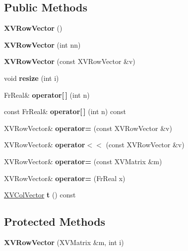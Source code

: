 \subsection*{Public Methods}
\begin{CompactItemize}
\item 
{\bf XVRow\-Vector} ()
\item 
{\bf XVRow\-Vector} (int nn)
\item 
{\bf XVRow\-Vector} (const XVRow\-Vector \&v)
\item 
void {\bf resize} (int i)
\item 
Fr\-Real\& {\bf operator\mbox{[}$\,$\mbox{]}} (int n)
\item 
const Fr\-Real\& {\bf operator\mbox{[}$\,$\mbox{]}} (int n) const
\item 
\label{XVRowVector_a6}
\hypertarget{class_XVRowVector_a6}{
XVRow\-Vector\& {\bf operator=} (const XVRow\-Vector \&v)}

\item 
\label{XVRowVector_a7}
\hypertarget{class_XVRowVector_a7}{
XVRow\-Vector\& {\bf operator$<$$<$} (const XVRow\-Vector \&v)}

\item 
\label{XVRowVector_a8}
\hypertarget{class_XVRowVector_a8}{
XVRow\-Vector\& {\bf operator=} (const XVMatrix \&m)}

\item 
\label{XVRowVector_a9}
\hypertarget{class_XVRowVector_a9}{
XVRow\-Vector\& {\bf operator=} (Fr\-Real x)}

\item 
\label{XVRowVector_a10}
\hypertarget{class_XVRowVector_a10}{
\hyperlink{class_XVColVector}{XVCol\-Vector} {\bf t} () const}

\end{CompactItemize}
\subsection*{Protected Methods}
\begin{CompactItemize}
\item 
{\bf XVRow\-Vector} (XVMatrix \&m, int i)
\end{CompactItemize}
